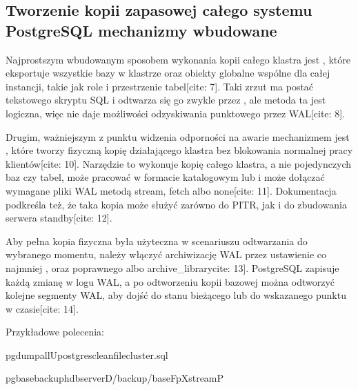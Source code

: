 \documentclass[letterpaper,10pt,polish]{sphinxmanual}
\begin{document}
\subsection{Tworzenie kopii zapasowej całego systemu PostgreSQL \sphinxhyphen{} mechanizmy wbudowane}
\label{\detokenize{rozdzial_2/rozdzial_28/index:tworzenie-kopii-zapasowej-calego-systemu-postgresql-mechanizmy-wbudowane}}
\sphinxAtStartPar
Najprostszym wbudowanym sposobem wykonania kopii całego klastra jest , które eksportuje wszystkie bazy w klastrze oraz obiekty globalne wspólne dla całej instancji, takie jak role i przestrzenie tabel{[}cite: 7{]}. Taki zrzut ma postać tekstowego skryptu SQL i odtwarza się go zwykle przez , ale metoda ta jest logiczna, więc nie daje możliwości odzyskiwania punktowego przez WAL{[}cite: 8{]}.

\sphinxAtStartPar
Drugim, ważniejszym z punktu widzenia odporności na awarie mechanizmem jest , które tworzy fizyczną kopię działającego klastra bez blokowania normalnej pracy klientów{[}cite: 10{]}. Narzędzie to wykonuje kopię całego klastra, a nie pojedynczych baz czy tabel, może pracować w formacie katalogowym lub  i może dołączać wymagane pliki WAL metodą stream, fetch albo none{[}cite: 11{]}. Dokumentacja podkreśla też, że taka kopia może służyć zarówno do PITR, jak i do zbudowania serwera standby{[}cite: 12{]}.

\sphinxAtStartPar
Aby pełna kopia fizyczna była użyteczna w scenariuszu odtwarzania do wybranego momentu, należy włączyć archiwizację WAL przez ustawienie co najmniej ,  oraz poprawnego  albo {\color{red}\bfseries{}\textasciigrave{}\textasciigrave{}}archive\_library\textasciigrave{}\textasciigrave{}{[}cite: 13{]}. PostgreSQL zapisuje każdą zmianę w logu WAL, a po odtworzeniu kopii bazowej można odtworzyć kolejne segmenty WAL, aby dojść do stanu bieżącego lub do wskazanego punktu w czasie{[}cite: 14{]}.

\sphinxAtStartPar
Przykładowe polecenia:

\begin{sphinxVerbatim}[commandchars=\\\{\}]
pg\PYGZus{}dumpall\PYGZhy{}Upostgres\PYGZhy{}\PYGZhy{}clean\PYGZhy{}\PYGZhy{}filecluster.sql

pg\PYGZus{}basebackup\PYGZhy{}hdbserver\PYGZhy{}D/backup/base\PYGZhy{}Fp\PYGZhy{}Xstream\PYGZhy{}P
\end{sphinxVerbatim}
\end{document}

